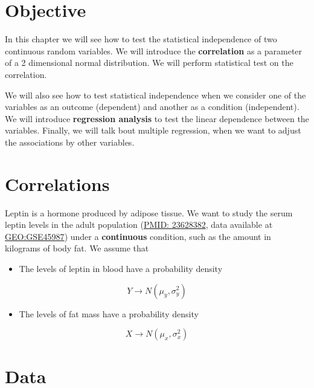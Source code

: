 \documentclass[
]{book}
\providecommand{\tightlist}{%
  \setlength{\itemsep}{0pt}\setlength{\parskip}{0pt}}
\begin{document}
\hypertarget{objective-13}{%
\section{Objective}\label{objective-13}}

In this chapter we will see how to test the statistical independence of two continuous random variables. We will introduce the \textbf{correlation} as a parameter of a 2 dimensional normal distribution. We will perform statistical test on the correlation.

We will also see how to test statistical independence when we consider one of the variables as an outcome (dependent) and another as a condition (independent). We will introduce \textbf{regression analysis} to test the linear dependence between the variables. Finally, we will talk bout multiple regression, when we want to adjust the associations by other variables.

\hypertarget{correlations}{%
\section{Correlations}\label{correlations}}

Leptin is a hormone produced by adipose tissue. We want to study the serum leptin levels in the adult population (\href{https://pubmed.ncbi.nlm.nih.gov/23628382/}{PMID: 23628382}, data available at \href{https://www.ncbi.nlm.nih.gov/geo/query/acc.cgi?acc=GSE45987}{GEO:GSE45987}) under a \textbf{continuous} condition, such as the amount in kilograms of body fat. We assume that

\begin{itemize}
\tightlist
\item
  The levels of leptin in blood have a probability density
\end{itemize}

\[Y \rightarrow N(\mu_y, \sigma_y^2)\]

\begin{itemize}
\tightlist
\item
  The levels of fat mass have a probability density
\end{itemize}

\[X \rightarrow N(\mu_x, \sigma_x^2)\]

\hypertarget{data-5}{%
\section{Data}\label{data-5}}
\end{document}
